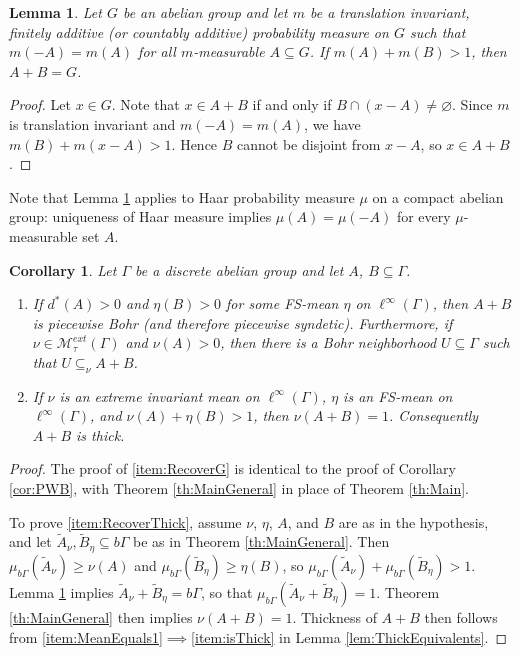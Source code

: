\documentclass[12pt]{amsart} \usepackage{amsmath,centernot,amssymb,leftindex}
\newtheorem{lemma}[theorem]{Lemma}
\newtheorem{corollary}[theorem]{Corollary}
\numberwithin{theorem}{section}
\numberwithin{equation}{section}
\theoremstyle{definition}
\begin{document}
	\begin{lemma}\label{lem:probability}
		Let $G$ be an abelian  group and let $m$ be a translation invariant, finitely additive (or countably additive) probability measure on $G$ such that $m(-A)=m(A)$ for all $m$-measurable $A\subseteq G$.  If $m(A) + m(B)>1$, then $A+B=G$.
	\end{lemma}
	
	\begin{proof}
		Let $x\in G$.  Note that $x\in A+B$ if and only if $B\cap (x-A)\neq \varnothing$.  Since $m$ is translation invariant and $m(-A)=m(A)$, we have $m(B)+m(x-A)>1$.  Hence $B$ cannot be disjoint from $x-A$, so $x\in A+B$.
	\end{proof}
	
	Note that Lemma \ref{lem:probability} applies to Haar probability measure $\mu$ on a compact abelian group: uniqueness of Haar measure implies $\mu(A)=\mu(-A)$ for every $\mu$-measurable set $A$.
	
	\begin{corollary}\label{cor:Recover}
		Let $\Gamma$ be a discrete abelian group and let $A$, $B\subseteq \Gamma$.
		\begin{enumerate}			
			\item\label{item:RecoverG} If $d^*(A)>0$ and $\eta(B)>0$ for some FS-mean $\eta$ on $\ell^\infty(\Gamma)$, then $A+B$ is piecewise Bohr (and  therefore piecewise syndetic).  Furthermore, if $\nu\in \mathcal M_{\tau}^{ext}(\Gamma)$ and $\nu(A)>0$, then there is a Bohr neighborhood $U\subseteq \Gamma$ such that $U \subseteq_{\nu} A+B$.
	
			\item\label{item:RecoverThick} If $\nu$ is an extreme invariant mean on $\ell^{\infty}(\Gamma)$, $\eta$ is an FS-mean on $\ell^\infty(\Gamma)$, and $\nu(A)+\eta(B)>1$, then $\nu(A+B)=1$. Consequently $A+B$ is thick. 			
\end{enumerate}
	\end{corollary}



	\begin{proof}
		The proof of  \ref{item:RecoverG} is identical to the proof of Corollary \ref{cor:PWB}, with Theorem \ref{th:MainGeneral} in place of Theorem \ref{th:Main}. 
		
		To prove \ref{item:RecoverThick}, assume $\nu$, $\eta$, $A$, and $B$ are as in the hypothesis, and let  $\tilde{A}_{\nu}, \tilde{B}_{\eta}\subseteq b\Gamma$ be as in Theorem \ref{th:MainGeneral}.  Then  $\mu_{b\Gamma}(\tilde{A}_{\nu})\geq \nu(A)$ and $\mu_{b\Gamma}(\tilde{B}_{\eta})\geq \eta(B)$, so $\mu_{b\Gamma}(\tilde{A}_{\nu})+\mu_{b\Gamma}(\tilde{B}_{\eta})> 1$.  Lemma \ref{lem:probability} implies $\tilde{A}_{\nu}+\tilde{B}_{\eta}=b\Gamma$, so that $\mu_{b\Gamma}(\tilde{A}_{\nu}+\tilde{B}_{\eta})=1$. Theorem \ref{th:MainGeneral}  then implies $\nu(A+B)=1$.			Thickness of $A+B$ then follows from  \ref{item:MeanEquals1}$\implies$\ref{item:isThick} in Lemma \ref{lem:ThickEquivalents}. \end{proof}
	
\end{document}
